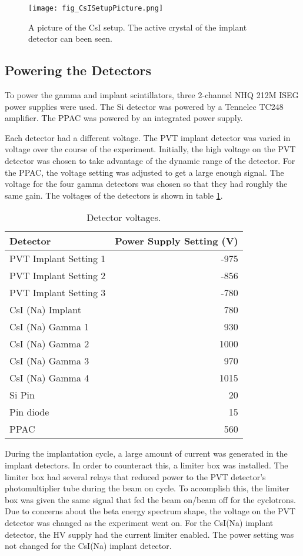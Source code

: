 \documentclass[../MaxHughesThesis.tex]{subfiles}
\begin{document}
\begin{figure}
	\centerline{\texttt{[image: fig\_CsISetupPicture.png]}}
	\caption{A picture of the CsI setup.
		 The active crystal of the implant detector can been seen. 
		 }
	\label{fig:CsIPicture}
\end{figure}

\subsection{Powering the Detectors}

To power the gamma and implant scintillators, three 2-channel NHQ 212M ISEG power supplies were used.
The Si detector was powered by a Tennelec TC248 amplifier.
The PPAC was powered by an integrated power supply.

Each detector had a different voltage. 
The PVT implant detector was varied in voltage over the course of the experiment.
Initially, the high voltage on the PVT detector was chosen to take advantage of the dynamic range of the detector.
For the PPAC, the voltage setting was adjusted to get a large enough signal.
The voltage for the four gamma detectors was chosen so that they had roughly the same gain.
The voltages of the detectors is shown in table \ref{tab:detvolt}.
\begin{table}[!hbt]
	\caption{Detector voltages.}
	\centering
		\begin{tabular}{lr}
		Detector & Power Supply Setting (V) \\ \hline
		PVT Implant Setting 1 & -975 \\
		PVT Implant Setting 2 & -856 \\
		PVT Implant Setting 3 & -780 \\
		CsI (Na) Implant & 780 \\ 
		CsI (Na) Gamma 1 & 930 \\
		CsI (Na) Gamma 2 & 1000 \\
		CsI (Na) Gamma 3 & 970 \\
		CsI (Na) Gamma 4 & 1015 \\
		Si Pin & 20 \\
		Pin diode & 15 \\
		PPAC & 560  
		\end{tabular}
	\label{tab:detvolt}
\end{table}

During the implantation cycle, a large amount of current was generated in the implant detectors.
In order to counteract this, a limiter box was installed.
The limiter box had several relays that reduced power to the PVT detector's photomultiplier tube during the beam on cycle. 
To accomplish this, the limiter box was given the same signal that fed the beam on/beam off for the cyclotrons.
Due to concerns about the beta energy spectrum shape, the voltage on the PVT detector was changed as the experiment went on. 
For the CsI(Na) implant detector, the HV supply had the current limiter enabled.
The power setting was not changed for the CsI(Na) implant detector. 
\end{document}
